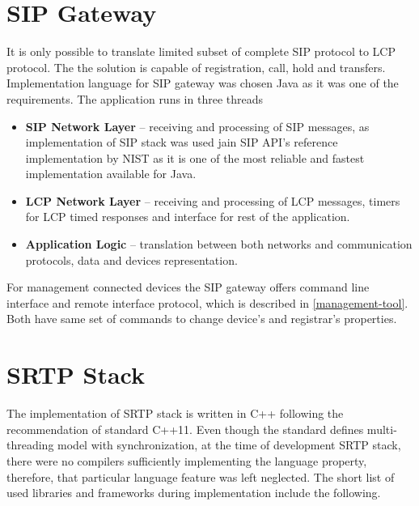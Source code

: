 
\section{SIP Gateway}
It is only possible to translate limited subset of complete SIP protocol to
LCP protocol. The the solution is capable of registration, call, hold
and transfers. Implementation language for SIP gateway was chosen Java as it was
one of the requirements. The application runs in three threads

\begin{itemize}
\item \textbf{SIP Network Layer} -- receiving and processing of SIP messages,
as implementation of SIP stack was used jain SIP API's reference implementation
by NIST as it is one of the most reliable and fastest implementation available
for Java\cite{jainsip}. 
\item \textbf{LCP Network Layer} -- receiving and processing of LCP messages,
timers for LCP timed responses and interface for rest of the application.
\item \textbf{Application Logic} -- translation between both networks and 
communication protocols, data and devices representation.
\end{itemize}

For management connected devices the SIP gateway offers command line interface
and remote interface protocol, which is described in \ref{management-tool}. Both
have same set of commands to change device's and registrar's properties.



\section{SRTP Stack}
The implementation of SRTP stack is written in C++ following the recommendation
of standard C++11. Even though the standard defines multi-threading model with
synchronization, at the time of development SRTP stack, there were no compilers
sufficiently implementing the language property, therefore, that particular 
language feature was left neglected. The short list of used libraries and 
frameworks during implementation include the following.  

